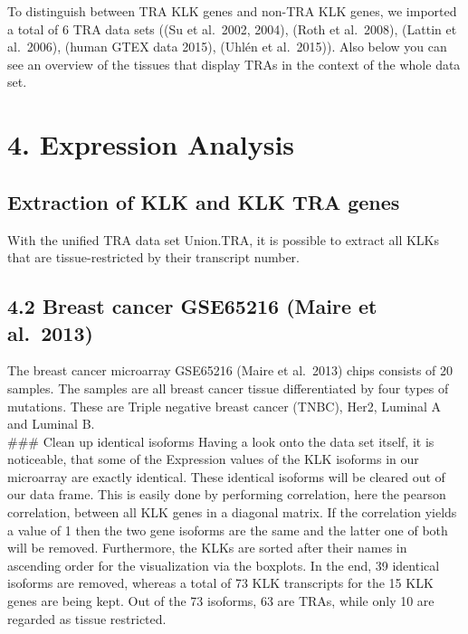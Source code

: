 \documentclass[
]{article}
\begin{document}
To distinguish between TRA KLK genes and non-TRA KLK genes, we imported
a total of 6 TRA data sets ((Su et al.~2002, 2004), (Roth et al.~2008),
(Lattin et al.~2006), (human GTEX data 2015), (Uhlén et al.~2015)). Also
below you can see an overview of the tissues that display TRAs in the
context of the whole data set.

\hypertarget{expression-analysis}{%
\section{4. Expression Analysis}\label{expression-analysis}}

\hypertarget{extraction-of-klk-and-klk-tra-genes}{%
\subsection{Extraction of KLK and KLK TRA
genes}\label{extraction-of-klk-and-klk-tra-genes}}

With the unified TRA data set Union.TRA, it is possible to extract all
KLKs that are tissue-restricted by their transcript number.

\hypertarget{breast-cancer-gse65216-maire-et-al.-2013}{%
\subsection{4.2 Breast cancer GSE65216 (Maire et
al.~2013)}\label{breast-cancer-gse65216-maire-et-al.-2013}}

The breast cancer microarray GSE65216 (Maire et al.~2013) chips consists
of 20 samples. The samples are all breast cancer tissue differentiated
by four types of mutations. These are Triple negative breast cancer
(TNBC), Her2, Luminal A and Luminal B.\\
\#\#\# Clean up identical isoforms Having a look onto the data set
itself, it is noticeable, that some of the Expression values of the KLK
isoforms in our microarray are exactly identical. These identical
isoforms will be cleared out of our data frame. This is easily done by
performing correlation, here the pearson correlation, between all KLK
genes in a diagonal matrix. If the correlation yields a value of 1 then
the two gene isoforms are the same and the latter one of both will be
removed. Furthermore, the KLKs are sorted after their names in ascending
order for the visualization via the boxplots. In the end, 39 identical
isoforms are removed, whereas a total of 73 KLK transcripts for the 15
KLK genes are being kept. Out of the 73 isoforms, 63 are TRAs, while
only 10 are regarded as tissue restricted.
\end{document}
